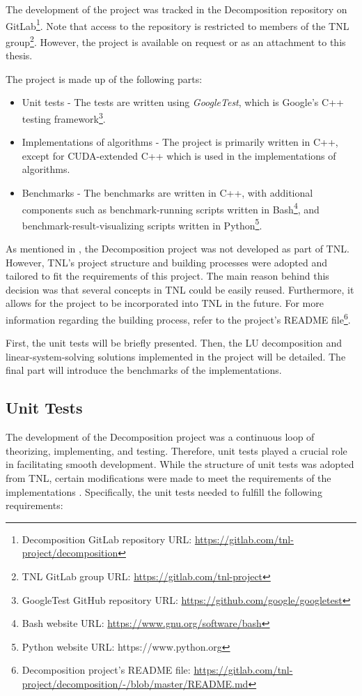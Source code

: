 The development of the project was tracked in the Decomposition repository on GitLab\footnote{Decomposition GitLab repository URL: \url{https://gitlab.com/tnl-project/decomposition}}. Note that access to the repository is restricted to members of the TNL group\footnote{TNL GitLab group URL: \url{https://gitlab.com/tnl-project}}. However, the project is available on request or as an attachment to this thesis.

The project is made up of the following parts:

\begin{itemize}
	\item Unit tests - The tests are written using \textit{GoogleTest}, which is Google's C++ testing framework\footnote{GoogleTest GitHub repository URL: \url{https://github.com/google/googletest}}.
	\item Implementations of algorithms - The project is primarily written in C++, except for CUDA-extended C++ which is used in the implementations of algorithms.
	\item Benchmarks - The benchmarks are written in C++, with additional components such as benchmark-running scripts written in Bash\footnote{Bash website URL: \url{https://www.gnu.org/software/bash}}, and benchmark-result-visualizing scripts written in Python\footnote{Python website URL: https://www.python.org}.
\end{itemize}

As mentioned in  \cite{Cejka2022}, the Decomposition project was not developed as part of TNL. However, TNL's project structure and building processes were adopted and tailored to fit the requirements of this project. The main reason behind this decision was that several concepts in TNL could be easily reused. Furthermore, it allows for the project to be incorporated into TNL in the future. For more information regarding the building process, refer to the project's README file\footnote{Decomposition project's README file: \url{https://gitlab.com/tnl-project/decomposition/-/blob/master/README.md}}.

First, the unit tests will be briefly presented. Then, the LU decomposition and linear-system-solving solutions implemented in the project will be detailed. The final part will introduce the benchmarks of the implementations.

\subsection{Unit Tests}\label{Subsection:implementation->decomposition-project->unit-tests}
The development of the Decomposition project was a continuous loop of theorizing, implementing, and testing. Therefore, unit tests played a crucial role in facilitating smooth development. While the structure of unit tests was adopted from TNL, certain modifications were made to meet the requirements of the implementations \cite{Cejka2022}. Specifically, the unit tests needed to fulfill the following requirements:

